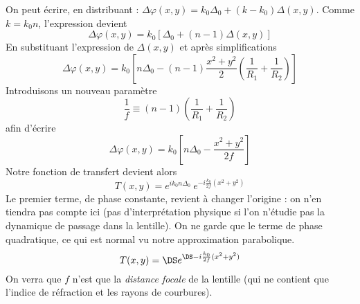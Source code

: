 	On peut écrire, en distribuant : $\Delta\varphi(x,y) = k_0\Delta_0 + (k-k_0)\Delta(x,y)$. Comme 
	$k=k_0n$, l'expression devient
	\begin{equation}
	\Delta\varphi(x,y) = k_0\left[\Delta_0+(n-1)\Delta(x,y)\right]
	\end{equation}
	En substituant l'expression de $\Delta(x,y)$ et après simplifications
	\begin{equation}
	\Delta \varphi(x,y) = k_0\left[n\Delta_0-(n-1)\dfrac{x^2+y^2}{2}\left(\dfrac{1}{R_1}+\dfrac{1}{R_2}\right)
	\right]
	\end{equation}
	Introduisons un nouveau paramètre
	\begin{equation}
	\frac{1}{f} \equiv (n-1)\left(\dfrac{1}{R_1}+\dfrac{1}{R_2}\right)
	\end{equation}
	afin d'écrire
	\begin{equation}
	\Delta\varphi(x,y) = k_0\left[n\Delta_0 - \dfrac{x^2+y^2}{2f}\right]
	\end{equation}
	Notre fonction de transfert devient alors
	\begin{equation}
	T(x,y) = e^{ik_0 n\Delta_0}\ e^{-i\frac{k_0}{2f}(x^2+y^2)}
	\end{equation}
	Le premier terme, de phase constante, revient à changer l'origine : on n'en tiendra pas compte ici (pas 
	d'interprétation physique si l'on n'étudie pas la dynamique de passage dans la lentille). On ne garde 
	que le terme de phase quadratique, ce qui est normal vu notre approximation parabolique. 
	\begin{equation}
	T(x,y) =\DS e^{\DS -i\frac{k_0}{2f}(x^2+y^2)}
	\end{equation}
	On verra que $f$ n'est que la \textit{distance focale} de la lentille (qui ne contient que l'indice de 
	réfraction et les rayons de courbures).
	
















